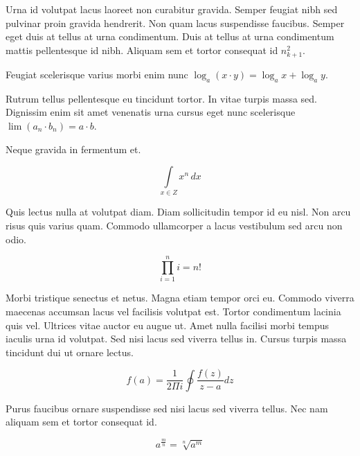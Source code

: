 \documentclass{article}
\begin{document}
	
    Urna id volutpat lacus laoreet non curabitur gravida. Semper feugiat nibh sed pulvinar proin gravida hendrerit. Non quam lacus suspendisse faucibus. Semper eget duis at tellus at urna condimentum. Duis at tellus at urna condimentum mattis pellentesque id nibh. Aliquam sem et tortor consequat id 
    \begin{math}
    n_{k+1}^2
    \end{math}.
    \newline
    
    Feugiat scelerisque varius morbi enim nunc $ \log _{a}(x\cdot y)=\log _{a}x+\log _{a}y $.
    \newline
    
    Rutrum tellus pellentesque eu tincidunt tortor. In vitae turpis massa sed. Dignissim enim sit amet venenatis urna cursus eget nunc scelerisque \( \lim\left ( a_n\cdot b_n \right )=a\cdot b \).
    \newline
    
    Neque gravida in fermentum et. 
    
    \[ \int\limits_{x\in Z}\! x^{n}\, dx  \]
    
    Quis lectus nulla at volutpat diam. Diam sollicitudin tempor id eu nisl. Non arcu risus quis varius quam. Commodo ullamcorper a lacus vestibulum sed arcu non odio.
    
    $$ \prod_{i=1}^ni=n! $$
    
    Morbi tristique senectus et netus. Magna etiam tempor orci eu. Commodo viverra maecenas accumsan lacus vel facilisis volutpat est. Tortor condimentum lacinia quis vel. Ultrices vitae auctor eu augue ut. Amet nulla facilisi morbi tempus iaculis urna id volutpat. Sed nisi lacus sed viverra tellus in. Cursus turpis massa tincidunt dui ut ornare lectus.
    
    \begin{displaymath}
    	f\left ( a \right ) = \frac{1}{2\Pi i} \oint \frac{f\left ( z \right )}{z-a} dz
    \end{displaymath}
    
    Purus faucibus ornare suspendisse sed nisi lacus sed viverra tellus. Nec nam aliquam sem et tortor consequat id.
    
    \begin{equation}
    a^{\frac{m}{n}}=\sqrt[n]{a^{m}}
    \end{equation}
    
\end{document}
